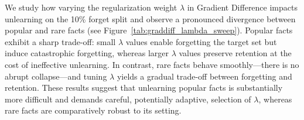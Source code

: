 



We study how varying the regularization weight \(\lambda\) in Gradient Difference impacts unlearning on the 10\% forget split and observe a pronounced divergence between popular and rare facts (see Figure~\ref{tab:graddiff_lambda_sweep}). Popular facts exhibit a sharp trade-off: small \(\lambda\) values enable forgetting the target set but induce catastrophic forgetting, whereas larger \(\lambda\) values preserve retention at the cost of ineffective unlearning. In contrast, rare facts behave smoothly—there is no abrupt collapse—and tuning \(\lambda\) yields a gradual trade-off between forgetting and retention. These results suggest that unlearning popular facts is substantially more difficult and demands careful, potentially adaptive, selection of \(\lambda\), whereas rare facts are comparatively robust to its setting.


